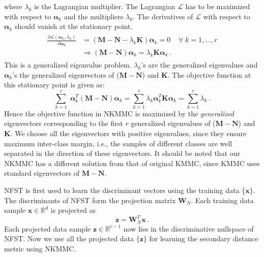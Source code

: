 \documentclass[runningheads]{llncs}
\begin{document}
where $\lambda_k$ is the Lagrangian multiplier. The Lagrangian $\mathcal{L}$ has to be maximized with respect to $\bm{\alpha}_{k}$ and the multipliers $\lambda_k$. The derivatives of $\mathcal{L}$ with respect to $\bm{\alpha}_k$ should vanish at the stationary point.
\begin{eqnarray}
\begin{aligned}
\frac{\partial \mathcal{L}(\bm{\alpha}_k,\lambda_k)}{\partial \bm{\alpha}_k} &= (\mathbf{M-N} - \lambda_k \mathbf{K})\bm{\alpha}_k =0
 \; \;\;\;\forall \; k=1,\ldots, r\\
 & \Rightarrow (\mathbf{M-N})\bm{\alpha}_k = \lambda_k \mathbf{K} \bm{\alpha}_k  \,.
 \end{aligned}
\end{eqnarray}
This is a generalized eigenvalue problem. $\lambda_k$'s are the generalized eigenvalues and $\bm{\alpha}_k$'s the generalized eigenvectors of ($\mathbf{M-N}$) and $\mathbf{K}$. The objective function at this stationary point is given as:
\begin{equation}
\sum\limits_{k=1}^r \;  \bm{\alpha}^T_{k} (\mathbf{M}  -  \mathbf{N})\bm{\alpha}_{k} = \sum\limits_{k=1}^r \lambda_k \bm{\alpha}^T_{k}\mathbf{K}\bm{\alpha}_{k} = \sum\limits_{k=1}^r \lambda_k \,.
\end{equation}
\noindent Hence the objective function in NKMMC is maximized by the \textit{generalized} eigenvectors corresponding to the first $r$ generalized eigenvalues of ($\mathbf{M-N}$) and $\mathbf{K}$. We choose all the eigenvectors with positive eigenvalues, since they ensure maximum inter-class margin, i.e., the samples of different classes are well separated in the direction of these eigenvectors. It should be noted that our  NKMMC has a different solution from that of original KMMC\cite{haifeng:mmc}, since KMMC uses standard eigenvectors of $\mathbf{M-N}$.



NFST is first used to  learn the  discriminant vectors using the training data \{$\mathbf{x}\}$. The discriminants of NFST form the projection matrix $\mathbf{W}_{N}$. Each training data sample $\mathbf{x}\in \mathbb{R}^d$ is projected as
\begin{equation}
\mathbf{z} = \mathbf{W}^T_{N} \mathbf{x} \,.
\end{equation}
Each projected data sample $\mathbf{z}\in \mathbb{R}^{c-1}$ now lies in the discriminative nullspace of NFST.  Now we use all the projected data $\{\mathbf{z}\}$ for learning the secondary distance metric using NKMMC.
\end{document}
